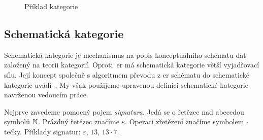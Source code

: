 \begin{figure}[!htb]
  \centering
  \caption{Příklad kategorie}%
  \label{fig:category-example}%
\end{figure}

\subsection{Schematická kategorie}

Schematická kategorie je mechanismus na popis konceptuálního schématu dat založený na teorii kategorií.
Oproti~\acrshort{er} má schematická kategorie větší vyjadřovací sílu.
Její koncept společně s algoritmem převodu z \acrshort{er} schématu do schematické kategorie uvádí~\cite{svoboda_categorical_2021}.
My však použijeme upravenou definici schematické kategorie navrženou vedoucím práce.

Nejprve zavedeme pomocný pojem \emph{signatura}.
Jedá se o řetězec nad abecedou symbolů $\mathbb{N}$.
Prázdný řetězec značíme $\varepsilon$.
Operaci zřetězení značíme symbolem $\cdot$ tečky.
Příklady signatur: $\varepsilon$, $13$, $13\cdot 7$.

